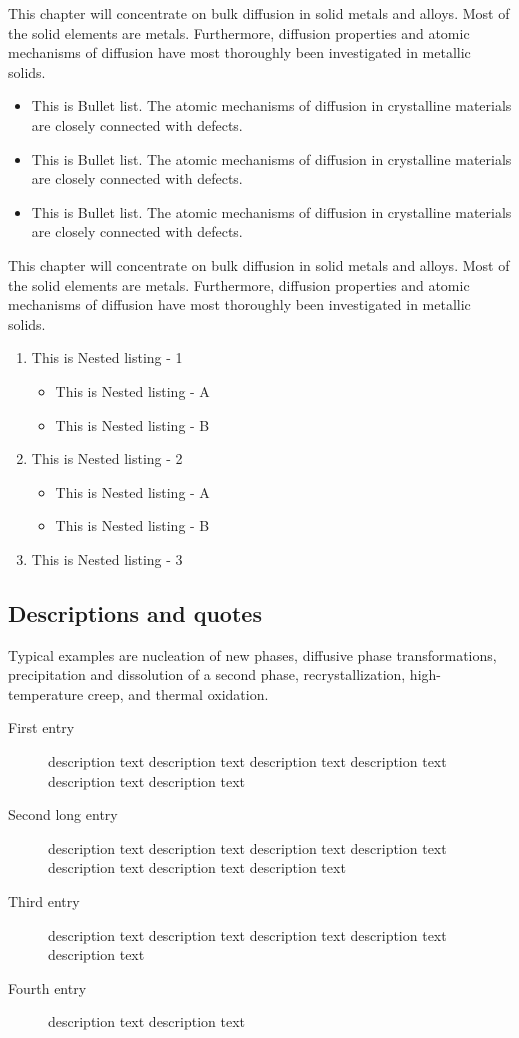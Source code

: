 \documentclass[cmbright]{WileySTAT-V1} %
\theoremstyle{plain}
\begin{document}
This chapter will concentrate on bulk diffusion in solid metals and alloys. Most of the solid elements are metals. Furthermore, diffusion properties and atomic mechanisms of diffusion have most thoroughly been investigated in metallic solids.
\begin{itemize} %
\item This is Bullet list. The atomic mechanisms of diffusion in crystalline materials are closely connected with defects.
\item This is Bullet list. The atomic mechanisms of diffusion in crystalline materials are closely connected with defects.
\item This is Bullet list. The atomic mechanisms of diffusion in crystalline materials are closely connected with defects.
\end{itemize}

This chapter will concentrate on bulk diffusion in solid metals and alloys. Most of the solid elements are metals. Furthermore, diffusion properties and atomic mechanisms of diffusion have most thoroughly been investigated in metallic solids.
\begin{enumerate} %
\item[1] This is Nested listing - 1
 \begin{itemize}
 \item This is Nested listing - A
 \item This is Nested listing - B
 \end{itemize}
\item[5] This is Nested listing - 2
 \begin{itemize}
 \item[--] This is Nested listing - A
 \item[--] This is Nested listing - B
 \end{itemize}
\item This is Nested listing - 3
\end{enumerate}

\subsection{Descriptions and quotes}\label{sec4.3}
Typical examples are nucleation of new phases, diffusive phase transformations, precipitation and dissolution of a second phase, recrystallization, high-temperature creep, and thermal oxidation.
\begin{description}
\item[First entry] description text description text description text description text description text description text
\item[Second long entry] description text description text description text description text description text description text description text
\item[Third entry] description text description text description text description text description text
\item[Fourth entry] description text description text
\end{description}
\end{document}
